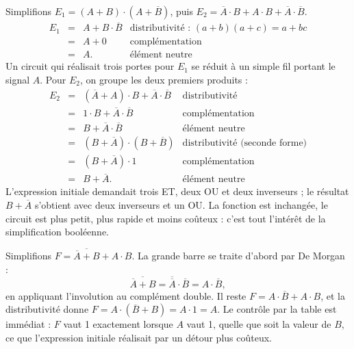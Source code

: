 \begin{exemple}
Simplifions $E_1 = (A + B) \cdot (A + \overline{B})$, puis $E_2 = \overline{A} \cdot B + A \cdot B + \overline{A} \cdot \overline{B}$.
\[
\begin{array}{rcll}
E_1 &=& A + B \cdot \overline{B} & \text{distributivité : } (a+b)(a+c) = a + bc\\
    &=& A + 0 & \text{complémentation}\\
    &=& A . & \text{élément neutre}
\end{array}
\]
Un circuit qui réalisait trois portes pour $E_1$ se réduit à un simple fil portant le signal $A$. Pour $E_2$, on groupe les deux premiers produits :
\[
\begin{array}{rcll}
E_2 &=& (\overline{A} + A) \cdot B + \overline{A} \cdot \overline{B} & \text{distributivité}\\
    &=& 1 \cdot B + \overline{A} \cdot \overline{B} & \text{complémentation}\\
    &=& B + \overline{A} \cdot \overline{B} & \text{élément neutre}\\
    &=& (B + \overline{A}) \cdot (B + \overline{B}) & \text{distributivité (seconde forme)}\\
    &=& (B + \overline{A}) \cdot 1 & \text{complémentation}\\
    &=& B + \overline{A} . & \text{élément neutre}
\end{array}
\]
L'expression initiale demandait trois ET, deux OU et deux inverseurs ; le résultat $B + \overline{A}$ s'obtient avec deux inverseurs et un OU. La fonction est inchangée, le circuit est plus petit, plus rapide et moins coûteux : c'est tout l'intérêt de la simplification booléenne.
\end{exemple}

\begin{exemple}
Simplifions $F = \overline{\overline{A} + B} + A \cdot B$. La grande barre se traite d'abord par De Morgan :
\[
\overline{\overline{A} + B} = \overline{\overline{A}} \cdot \overline{B} = A \cdot \overline{B},
\]
en appliquant l'involution au complément double. Il reste $F = A \cdot \overline{B} + A \cdot B$, et la distributivité donne $F = A \cdot (\overline{B} + B) = A \cdot 1 = A$. Le contrôle par la table est immédiat : $F$ vaut 1 exactement lorsque $A$ vaut 1, quelle que soit la valeur de $B$, ce que l'expression initiale réalisait par un détour plus coûteux.
\end{exemple}

